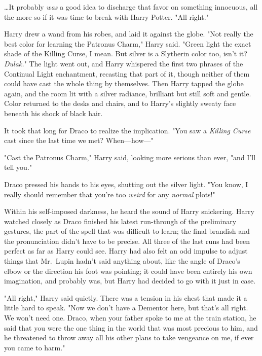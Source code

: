 {\ldots}It probably \emph{was} a good idea to discharge that favor on something 
innocuous, all the more so if it was time to break with Harry Potter. "All 
right."

Harry drew a wand from his robes, and laid it against the globe. "Not really 
the best color for learning the Patronus Charm," Harry said. "Green light the 
exact shade of the Killing Curse, I mean. But silver is a Slytherin color too, 
isn't it? \emph{Dulak.}" The light went out, and Harry whispered the first two 
phrases of the Continual Light enchantment, recasting that part of it, though 
neither of them could have cast the whole thing by themselves. Then Harry 
tapped the globe again, and the room lit with a silver radiance, brilliant but 
still soft and gentle. Color returned to the desks and chairs, and to Harry's 
slightly sweaty face beneath his shock of black hair.

It took that long for Draco to realize the implication. "You saw a 
\emph{Killing Curse} cast since the last time we met? When---how---"

"Cast the Patronus Charm," Harry said, looking more serious than ever, "and 
I'll tell you."

Draco pressed his hands to his eyes, shutting out the silver light. "You know, 
I really should remember that you're too \emph{weird} for any \emph{normal} 
plots!"

Within his self-imposed darkness, he heard the sound of Harry snickering.
\sbreak
Harry watched closely as Draco finished his latest run-through of the 
preliminary gestures, the part of the spell that was difficult to learn; the 
final brandish and the pronunciation didn't have to be precise. All three of 
the last runs had been perfect as far as Harry could see. Harry had also felt 
an odd impulse to adjust things that Mr.~Lupin hadn't said anything about, like 
the angle of Draco's elbow or the direction his foot was pointing; it could 
have been entirely his own imagination, and probably was, but Harry had decided 
to go with it just in case.

"All right," Harry said quietly. There was a tension in his chest that made it 
a little hard to speak. "Now we don't have a Dementor here, but that's all 
right. We won't need one. Draco, when your father spoke to me at the train 
station, he said that you were the one thing in the world that was most 
precious to him, and he threatened to throw away all his other plans to take 
vengeance on me, if ever you came to harm."

